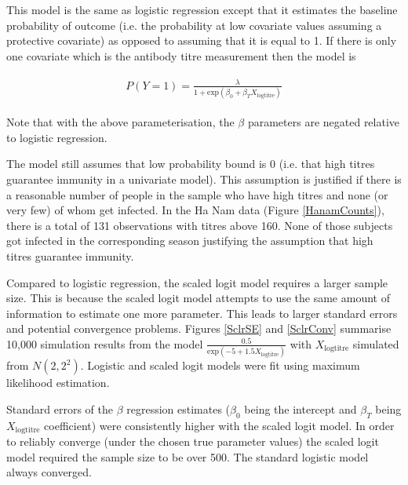 This model is the same as logistic regression except that it estimates the baseline probability of outcome (i.e. the probability at low covariate values assuming a protective covariate) as opposed to assuming that it is equal to 1. If there is only one covariate which is the antibody titre measurement then the model is

\begin{align*}
\begin{gathered}
P(Y=1) = \frac{\lambda}{1 + \text{exp}(\beta_0 + \beta_T X_{\text{logtitre}})}
\end{gathered}
\end{align*}

Note that with the above parameterisation, the $\beta$ parameters are negated relative to logistic regression.

The model still assumes that low probability bound is 0 (i.e. that high titres guarantee immunity in a univariate model). This assumption is justified if there is a reasonable number of people in the sample who have high titres and none (or very few) of whom get infected. In the Ha Nam data (Figure \ref{HanamCounts}), there is a total of 131 observations with titres above 160. None of those subjects got infected in the corresponding season justifying the assumption that high titres guarantee immunity.

Compared to logistic regression, the scaled logit model requires a larger sample size. This is because the scaled logit model attempts to use the same amount of information to estimate one more parameter. This leads to larger standard errors and potential convergence problems. Figures \ref{SclrSE} and \ref{SclrConv} summarise 10,000 simulation results from the model $\frac{0.5}{\text{exp}(-5 + 1.5 X_{\text{logtitre}})}$ with $X_{\text{logtitre}}$ simulated from $N(2, 2^2)$. Logistic and scaled logit models were fit using maximum likelihood estimation. 

Standard errors of the $\beta$ regression estimates ($\beta_0$ being the intercept and $\beta_T$ being $X_{\text{logtitre}}$ coefficient) were consistently higher with the scaled logit model. In order to reliably converge (under the chosen true parameter values) the scaled logit model required the sample size to be over 500. The standard logistic model always converged.


